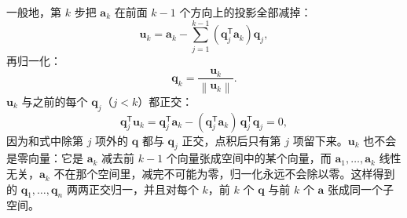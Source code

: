 \documentclass[UTF8,a4paper,12pt]{ctexart}
\numberwithin{equation}{section}
\newcommand{\norm}[1]{\left\lVert #1 \right\rVert}
\newcommand{\trans}{^{\mathsf T}}
\begin{document}
	一般地，第 $k$ 步把 $\bm{a}_k$ 在前面 $k-1$ 个方向上的投影全部减掉：
	\begin{equation}\label{eq:6.83}
	\bm{u}_k
	=
	\bm{a}_k
	-
	\sum_{j=1}^{k-1}
	(\bm{q}_j\trans\bm{a}_k)\bm{q}_j,
	\end{equation}
	再归一化：
	\begin{equation}\label{eq:6.84}
	\bm{q}_k
	=
	\frac{\bm{u}_k}{\norm{\bm{u}_k}}.
	\end{equation}
	$\bm{u}_k$ 与之前的每个 $\bm{q}_j$（$j<k$）都正交：
	\begin{equation}\label{eq:6.85}
	\bm{q}_j\trans\bm{u}_k
	=\bm{q}_j\trans\bm{a}_k-(\bm{q}_j\trans\bm{a}_k)\,\bm{q}_j\trans\bm{q}_j
	=0,
	\end{equation}
	因为和式中除第 $j$ 项外的 $\bm{q}$ 都与 $\bm{q}_j$ 正交，点积后只有第 $j$ 项留下来。$\bm{u}_k$ 也不会是零向量：它是 $\bm{a}_k$ 减去前 $k-1$ 个向量张成空间中的某个向量，而 $\bm{a}_1,\ldots,\bm{a}_k$ 线性无关，$\bm{a}_k$ 不在那个空间里，减完不可能为零，归一化永远不会除以零。这样得到的 $\bm{q}_1,\ldots,\bm{q}_n$ 两两正交归一，并且对每个 $k$，前 $k$ 个 $\bm{q}$ 与前 $k$ 个 $\bm{a}$ 张成同一个子空间。
\end{document}
